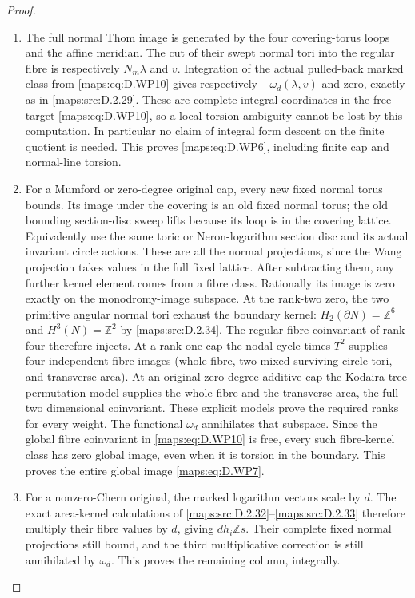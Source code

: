 \begin{proof}
\begin{enumerate}[label=\arabic*.,leftmargin=*]
\item The full normal Thom image is generated by the
four covering-torus loops and the affine meridian.
The cut of their swept normal tori into the regular
fibre is respectively $N_m\lambda$ and $v$.
Integration of the actual pulled-back marked
class from \eqref{maps:eq:D.WP10} gives respectively
$-\omega_d(\lambda,v)$ and zero, exactly as in
\ref{maps:src:D.2.29}. These are complete integral coordinates
in the free target \eqref{maps:eq:D.WP10}, so a local torsion
ambiguity cannot be lost by this computation.
In particular no claim of integral form descent
on the finite quotient is needed.
This proves \eqref{maps:eq:D.WP6}, including finite cap and
normal-line torsion.

\item For a Mumford or zero-degree original cap, every
new fixed normal torus bounds. Its image under
the covering is an old fixed normal torus; the
old bounding section-disc sweep lifts because
its loop is in the covering lattice. Equivalently
use the same toric or Neron-logarithm section
disc and its actual invariant circle actions.
These are all the normal projections, since
the Wang projection takes values in the full
fixed lattice.
After subtracting them, any further kernel
element comes from a fibre class. Rationally
its image is zero exactly on the monodromy-image
subspace. At the rank-two zero, the two primitive
angular normal tori exhaust the boundary kernel:
$H_2(\partial N)=\mathbb Z^6$ and
$H^3(N)=\mathbb Z^2$ by \ref{maps:src:D.2.34}. The regular-fibre
coinvariant of rank four therefore injects. At a
rank-one cap the nodal cycle times $T^2$ supplies
four independent fibre images (whole fibre, two
mixed surviving-circle tori, and transverse area).
At an original zero-degree additive cap the
Kodaira-tree permutation model supplies the whole
fibre and the transverse area, the full two
dimensional coinvariant. These explicit models
prove the required ranks for every weight.
The functional $\omega_d$ annihilates that
subspace. Since the global fibre coinvariant
in \eqref{maps:eq:D.WP10} is free, every such fibre-kernel
class has zero global image, even when it is
torsion in the boundary. This proves the entire
global image \eqref{maps:eq:D.WP7}.

\item For a nonzero-Chern original, the marked logarithm
vectors scale by $d$. The exact area-kernel
calculations of \ref{maps:src:D.2.32}--\ref{maps:src:D.2.33} therefore multiply
their fibre values by $d$, giving $dh_i\mathbb Zs$.
Their complete fixed normal projections still
bound, and the third multiplicative correction
is still annihilated by $\omega_d$.
This proves the remaining column, integrally.


\end{enumerate}
\end{proof}
